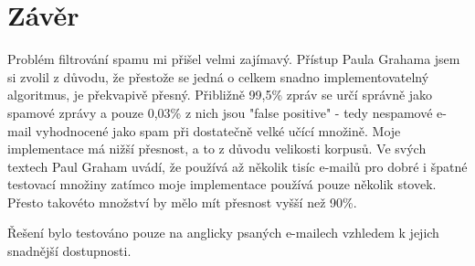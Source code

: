 \documentclass{semestralka}
\begin{document}
\chapter{Závěr}
Problém filtrování spamu mi přišel velmi zajímavý. Přístup Paula Grahama jsem si zvolil z důvodu, že přestože se jedná o celkem snadno implementovatelný algoritmus, je překvapivě přesný. Přibližně 99,5\% zpráv se určí správně jako spamové zprávy a pouze 0,03\% z nich jsou "false positive" - tedy nespamové e-mail vyhodnocené jako spam při dostatečně velké učící množině. Moje implementace má nižší přesnost, a to z důvodu velikosti korpusů. Ve svých textech Paul Graham uvádí, že používá až několik tisíc e-mailů pro dobré i špatné testovací množiny zatímco moje implementace používá pouze několik stovek. Přesto takovéto množství by mělo mít přesnost vyšší než 90\%.

Řešení bylo testováno pouze na anglicky psaných e-mailech vzhledem k jejich snadnější dostupnosti.



\end{document}
